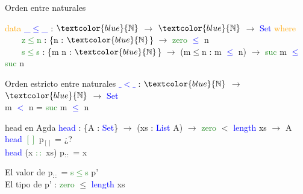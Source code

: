 \documentclass[xcolor=dvipsnames]{beamer} %
\newcommand{\cf}[1]{\textcolor{blue}{#1}}
\newcommand{\ct}[1]{\textcolor{blue}{#1}}
\newcommand{\cc}[1]{\textcolor{ForestGreen}{#1}}
\newcommand{\ck}[1]{\textcolor{orange}{#1}}
\newcommand{\N}{\ct{\mathbb{N}}}
\newcommand{\ra}{\rightarrow}
\begin{document}
\begin{frame}

\begin{block}{Orden entre naturales}

\ck{data} \ct{\_$\leq$\_} : $\N$ $\ra$ $\N$ $\ra$ \ct{Set} \ck{where}\\
\ \ \ \ \cc{z$\leq$n} : \{n : $\N$\}                 $\ra$ \cc{zero}  \ct{$\leq$} n\\
\ \ \ \ \cc{s$\leq$s} : \{m n : $\N$\} $\ra$ (m$\leq$n : m \ct{$\leq$} n) $\ra$ \cc{suc} m \ct{$\leq$} \cc{suc} n

\end{block}

\begin{block}{Orden estricto entre naturales}
\cf{$\_<\_$} : $\N$ $\ra$ $\N$ $\ra$ \ct{Set}\\
m \cf{$<$} n = \cc{suc} m \cf{$\leq$} n
\end{block}

\begin{block}{head en Agda}
    \cf{head} : \{A : \ct{Set}\}  $\ra$ (xs : \ct{List} A) $\ra$ 
    \cc{zero} $<$ \ct{length} xs $\rightarrow$ A \\
    \cf{head} \cc{$[]$} p$_{[]}$ = ¿?\\
    \cf{head} (x \cc{$::$} xs) p$_{::}$ = x
  \end{block}  

\begin{block}{}
El valor de p$_{::}$ = \cc{s$\leq$s} p'\\
El tipo de p' : \cc{zero} $\leq$ \cf{length} xs
\end{block}

\end{frame}
\end{document}
